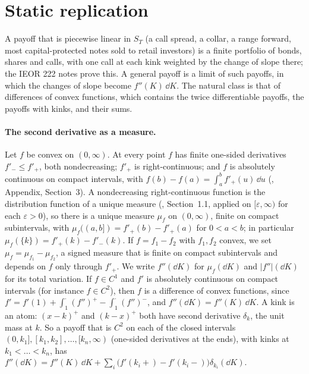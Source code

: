 \section{Static replication}\label{sec:sr-carr-madan}

A payoff that is piecewise linear in $S_T$ (a call spread, a collar, a range forward, most capital-protected
notes sold to retail investors) is a finite portfolio of bonds, shares and calls, with one call at
each kink weighted by the change of slope there; the IEOR 222 notes prove this. A general payoff is a
limit of such payoffs, in which the changes of slope become $f''(K)\,\dd K$. The natural class is that
of differences of convex functions, which contains the twice differentiable payoffs, the payoffs with
kinks, and their sums.

\paragraph{The second derivative as a measure.} Let $f$ be convex on $(0,\infty)$. At every point $f$ has
finite one-sided derivatives $f'_-\le f'_+$, both nondecreasing; $f'_+$ is right-continuous; and $f$ is
absolutely continuous on compact intervals, with $f(b)-f(a)=\int_a^bf'_+(u)\,\dd u$
(\textcite{revuz-yor}, Appendix, Section~3). A nondecreasing right-continuous function is the distribution
function of a unique measure (\textcite{durrett}, Section~1.1, applied on $[\varepsilon,\infty)$ for each
$\varepsilon>0$), so there is a unique measure $\mu_f$ on
$(0,\infty)$, finite on compact subintervals, with $\mu_f((a,b])=f'_+(b)-f'_+(a)$ for $0<a<b$; in particular
$\mu_f(\{k\})=f'_+(k)-f'_-(k)$. If $f=f_1-f_2$ with $f_1,f_2$ convex, we set $\mu_f=\mu_{f_1}-\mu_{f_2}$, a
signed measure that is finite on compact subintervals and depends on $f$ only through $f'_+$. We write
$f''(\dd K)$ for $\mu_f(\dd K)$ and $|f''|(\dd K)$ for its total variation. If $f\in C^1$ and $f'$ is absolutely
continuous on compact intervals (for instance $f\in C^2$), then $f$ is a difference of convex functions, since
$f'=f'(1)+\int_1^\cdot(f'')^+-\int_1^\cdot(f'')^-$, and $f''(\dd K)=f''(K)\,\dd K$. A kink is an atom: $(x-k)^+$ and
$(k-x)^+$ both have second derivative $\delta_k$, the unit mass at $k$. So a payoff that is $C^2$ on each of the closed
intervals $(0,k_1],[k_1,k_2],\dots,[k_n,\infty)$ (one-sided derivatives at the ends), with kinks at $k_1<\dots<k_n$, has $f''(\dd K)=f''(K)\,\dd K+\sum_i\big(f'(k_i+)-f'(k_i-)\big)\delta_{k_i}(\dd K)$.

